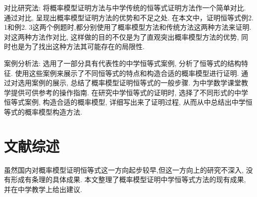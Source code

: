 对比研究法: 将概率模型证明方法与中学传统的恒等式证明方法作一个简单对比. 通过对比, 呈现出概率模型证明方法的优势和不足之处. 在本文中，证明恒等式例2. 1和例2. 3这两个例题时,都分别使用了概率模型方法和传统方法这两种方法来证明. 对这两种方法作对比, 这样做的目的不仅是为了直观突出概率模型方法的优势, 同时也是为了找出这种方法其可能存在的局限性. 


案例分析法: 选用了一部分具有代表性的中学恒等式案例, 分析了恒等式的结构特征. 使用这些案例来展示了不同恒等式的特点和构造合适的概率模型进行证明. 通过对选用案例的展示, 总结了概率模型证明恒等式的一般步骤. 为中学数学课堂教学提供可供参考的操作指南. 在研究中学恒等式的证明时, 选择了不同形式的中学恒等式案例, 构造合适的概率模型, 详细写出来了证明过程, 从而从中总结出中学恒等式的概率模型构造方法. 



\section{文献综述}
虽然国内对概率模型证明恒等式这一方向起步较早,但这一方向上的研究不深入, 没有形成有条理的具体成果. 本文整理了概率模型证明中学恒等式方法的现有成果, 并在中学教学上给出建议. 

